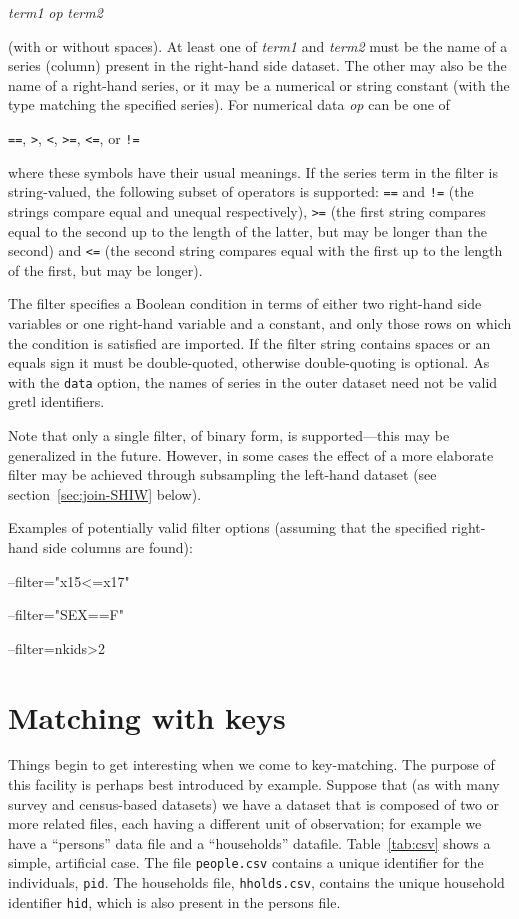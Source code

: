 \qquad \textsl{term1} \textsl{op} \textsl{term2}

(with or without spaces). At least one of \textsl{term1} and
\textsl{term2} must be the name of a series (column) present in the
right-hand side dataset. The other may also be the name of a
right-hand series, or it may be a numerical or string constant (with
the type matching the specified series). For numerical data
\textsl{op} can be one of

\qquad \verb|==|, \verb|>|, \verb|<|, \verb|>=|, \verb|<=|, or
\verb|!=|

where these symbols have their usual meanings. If the series term in
the filter is string-valued, the following subset of operators is
supported: \verb|==| and \verb|!=| (the strings compare equal and
unequal respectively), \verb|>=| (the first string compares equal to
the second up to the length of the latter, but may be longer than the
second) and \verb|<=| (the second string compares equal with the first
up to the length of the first, but may be longer).

The filter specifies a Boolean condition in terms of either two
right-hand side variables or one right-hand variable and a constant,
and only those rows on which the condition is satisfied are
imported. If the filter string contains spaces or an equals sign it
must be double-quoted, otherwise double-quoting is optional. As with
the \texttt{data} option, the names of series in the outer dataset
need not be valid gretl identifiers.

Note that only a single filter, of binary form, is supported---this
may be generalized in the future. However, in some cases the effect of
a more elaborate filter may be achieved through subsampling the
left-hand dataset (see section~\ref{sec:join-SHIW} below).

Examples of potentially valid filter options (assuming that the
specified right-hand side columns are found):
\begin{code}
--filter="x15<=x17"

--filter="SEX==F"

--filter=nkids>2
\end{code}

\section{Matching with keys}
\label{sec:join-keys}

Things begin to get interesting when we come to key-matching. The
purpose of this facility is perhaps best introduced by example.
Suppose that (as with many survey and census-based datasets) we have a
dataset that is composed of two or more related files, each having a
different unit of observation; for example we have a ``persons'' data
file and a ``households'' datafile. Table~\ref{tab:csv} shows a
simple, artificial case. The file \texttt{people.csv} contains a
unique identifier for the individuals, \texttt{pid}. The households
file, \texttt{hholds.csv}, contains the unique household identifier
\texttt{hid}, which is also present in the persons file. 

